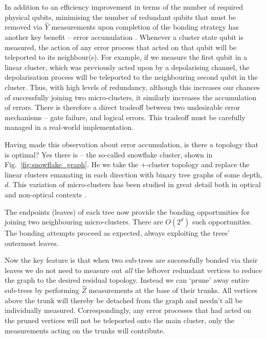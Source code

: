 In addition to an efficiency improvement in terms of the number of required physical qubits, minimising the number of redundant qubits that must be removed via $\hat{Y}$ measurements upon completion of the bonding strategy has another key benefit -- error accumulation \cite{RohdeMunroEtal}. Whenever a cluster state qubit is measured, the action of any error process that acted on that qubit will be teleported to its neighbour(s). For example, if we measure the first qubit in a linear cluster, which was previously acted upon by a depolarising channel, the depolarisation process will be teleported to the neighbouring second qubit in the cluster. Thus, with high levels of redundancy, although this increases our chances of successfully joining two micro-clusters, it similarly increases the accumulation of errors. There is therefore a direct tradeoff between two undesirable error mechanisms -- gate failure, and logical errors. This tradeoff must be carefully managed in a real-world implementation.

Having made this observation about error accumulation, is there a topology that is optimal? Yes there is -- the so-called snowflake cluster, shown in Fig.~\ref{fig:snowflake_graph}. He we take the $+$-cluster topology and replace the linear clusters emanating in each direction with binary tree graphs of some depth, $d$. This variation of micro-clusters has been studied in great detail both in optical and non-optical contexts \cite{SimonBenjaminPapers}.

The endpoints (leaves) of each tree now provide the bonding opportunities for joining two neighbouring micro-clusters. There are $O(2^d)$ such opportunities. The bonding attempts proceed as expected, always exploiting the trees' outermost leaves.

Now the key feature is that when two sub-trees are successfully bonded via their leaves we do not need to measure out \textit{all} the leftover redundant vertices to reduce the graph to the desired residual topology. Instead we can `prune' away entire sub-trees by performing $\hat{Z}$ measurements at the base of their trunks. All vertices above the trunk will thereby be detached from the graph and needn't all be individually measured. Correspondingly, any error processes that had acted on the pruned vertices will not be teleported onto the main cluster, only the measurements acting on the trunks will contribute.

